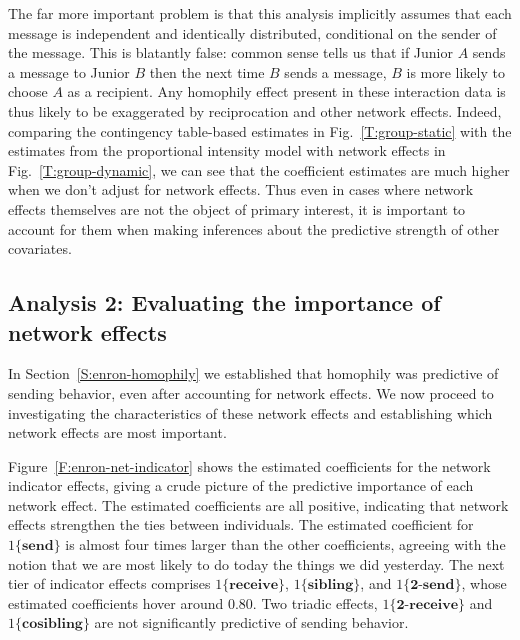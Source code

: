 \documentclass[final]{statsoc}
\begin{document}
The far more important
problem is that this analysis implicitly assumes that each message is
independent and identically distributed, conditional on the sender of
the message.  This is blatantly false: common sense tells us that if Junior $A$ sends a message
to Junior $B$ then the next time $B$ sends a message, $B$ is more likely to
choose $A$ as a recipient.  Any homophily effect present in these interaction 
data is thus likely to be exaggerated by reciprocation and other network effects.  Indeed, 
comparing the contingency table-based estimates in Fig.~\ref{T:group-static}
with the estimates from the proportional intensity model with network effects
in Fig.~\ref{T:group-dynamic}, we can see that the coefficient estimates are
much higher when we don't adjust for network effects.  Thus even in cases where network effects themselves
are not the object of primary interest, it is important to account for them when
making inferences about the predictive strength of other covariates.

\subsection{Analysis 2: Evaluating the importance of network effects}
\label{S:enron-network}

In Section~\ref{S:enron-homophily} we established that homophily was
predictive of sending behavior, even after accounting for network effects.  We
now proceed to investigating the characteristics of these network effects and
establishing which network effects are most important.

Figure~\ref{F:enron-net-indicator} shows the estimated coefficients for the
network indicator effects, giving a crude picture of the predictive importance
of each network effect.  The estimated coefficients are all positive,
indicating that network effects strengthen the ties between individuals.  The
estimated coefficient for $1\{\textbf{send}\}$ is almost four times larger
than the other coefficients, agreeing with the notion that we are most likely
to do today the things we did yesterday.  The next tier of indicator effects
comprises $1\{\textbf{receive}\}$, $1\{\textbf{sibling}\}$, and
$1\{\textbf{2-send}\}$, whose estimated coefficients hover around $0.80$.
Two triadic effects, $1\{\textbf{2-receive}\}$ and
$1\{\textbf{cosibling}\}$ are not significantly predictive of sending behavior.
\end{document}
